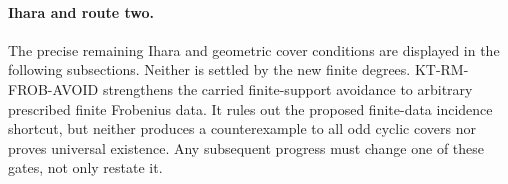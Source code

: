 \paragraph{Ihara and route two.}
The precise remaining Ihara and geometric cover conditions
are displayed in the following subsections. Neither is
settled by the new finite degrees. KT-RM-FROB-AVOID strengthens
the carried finite-support avoidance to arbitrary prescribed
finite Frobenius data. It rules out the proposed finite-data
incidence shortcut, but neither produces a counterexample to
all odd cyclic covers nor proves universal existence.
Any subsequent progress
must change one of these gates, not only restate it.
